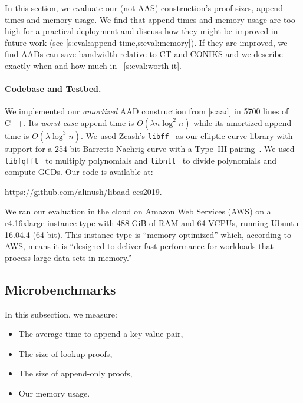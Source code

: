 In this section, we evaluate our \biaad (not AAS) construction's proof sizes, append times and memory usage.
We find that append times and memory usage are too high for a practical deployment and discuss how they might be improved in future work (see \cref{s:eval:append-time,s:eval:memory}).
If they are improved, we find AADs can save bandwidth relative to CT and CONIKS and we describe exactly when and how much in ~\cref{s:eval:worth-it}.

\paragraph{Codebase and Testbed.}
We implemented our \textit{amortized} AAD construction from \cref{s:aad} in 5700 lines of C++.
Its \textit{worst-case} append time is $O(\lambda n \log^2{n})$ while its amortized append time is $O(\lambda \log^3{n})$.
We used Zcash's \texttt{libff}~\cite{libff} as our elliptic curve library with support for a 254-bit Barretto-Naehrig curve with a Type~III pairing~\cite{bn-curve}.
We used \texttt{libfqfft}~\cite{libfqfft} to multiply polynomials and \texttt{libntl}~\cite{libntl} to divide polynomials and compute GCDs.
Our code is available at:
\begin{center}
    \url{https://github.com/alinush/libaad-ccs2019}.
\end{center}
We ran our evaluation in the cloud on Amazon Web Services (AWS) on a r4.16xlarge instance type with 488 GiB of RAM and 64 VCPUs, running Ubuntu 16.04.4 (64-bit).
This instance type is ``memory-optimized'' which, according to AWS, means it is ``designed to deliver fast performance for workloads that process large data sets in memory.''

\subsection{Microbenchmarks}
In this subsection, we measure:
\begin{itemize}
  \item The average time to append a key-value pair,
  \item The size of lookup proofs,
  \item The size of append-only proofs,
  \item Our memory usage.
\end{itemize}
  

